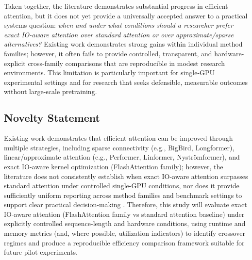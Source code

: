 \documentclass[12pt, a4paper]{article}
\begin{document}
Taken together, the literature demonstrates substantial progress in efficient attention, but it does not yet provide a universally accepted answer to a practical systems question: \emph{when and under what conditions should a researcher prefer exact IO-aware attention over standard attention or over approximate/sparse alternatives?} Existing work demonstrates strong gains within individual method families; however, it often fails to provide controlled, transparent, and hardware-explicit cross-family comparisons that are reproducible in modest research environments. This limitation is particularly important for single-GPU experimental settings and for research that seeks defensible, measurable outcomes without large-scale pretraining.

\subsection{Novelty Statement}

Existing work demonstrates that efficient attention can be improved through multiple strategies, including sparse connectivity (e.g., BigBird, Longformer), linear/approximate attention (e.g., Performer, Linformer, Nystr\"{o}mformer), and exact IO-aware kernel optimization (FlashAttention family); however, the literature does not consistently establish when exact IO-aware attention surpasses standard attention under controlled single-GPU conditions, nor does it provide sufficiently uniform reporting across method families and benchmark settings to support clear practical decision-making \parencite{zaheer2021bigbirdtransformerslonger, beltagy2020longformerlongdocumenttransformer, choromanski2022rethinkingattentionperformers, dao2022flashattentionfastmemoryefficientexact, tay2020longrangearenabenchmark, zhang2025cabcomprehensiveattentionbenchmarking}. Therefore, this study will evaluate exact IO-aware attention (FlashAttention family vs standard attention baseline) under explicitly controlled sequence-length and hardware conditions, using runtime and memory metrics (and, where possible, utilization indicators) to identify crossover regimes and produce a reproducible efficiency comparison framework suitable for future pilot experiments.


\nocite{*}
\printbibliography[heading=bibnumbered, title={References}]


\end{document}
